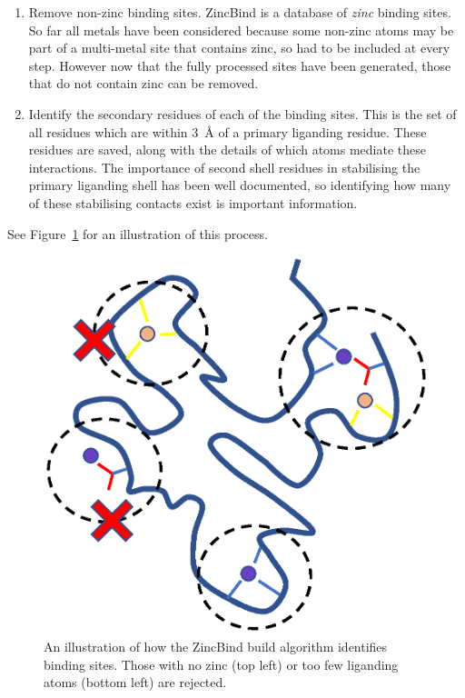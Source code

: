 \begin{enumerate}
   \item Remove non-zinc binding sites. ZincBind is a database of \emph{zinc} binding sites. So far all metals have been considered because some non-zinc atoms may be part of a multi-metal site that contains zinc, so had to be included at every step. However now that the fully processed sites have been generated, those that do not contain zinc can be removed.
   \item Identify the secondary residues of each of the binding sites. This is the set of all residues which are within 3~{\AA} of a primary liganding residue. These residues are saved, along with the details of which atoms mediate these interactions. The importance of second shell residues in stabilising the primary liganding shell has been well documented, so identifying how many of these stabilising contacts exist is important information.
\end{enumerate}

See Figure~\ref{fig:zincbind-build} for an illustration of this process.

\begin{figure}
\centering
\includegraphics[width=1.0\textwidth]{Figures/zincbind-build.eps}
\caption[The ZincBind build process.]{\label{fig:zincbind-build} An illustration of how the ZincBind build algorithm identifies binding sites. Those with no zinc (top left) or too few liganding atoms (bottom left) are rejected.}
\end{figure}

